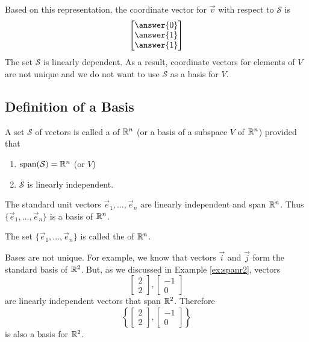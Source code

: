 \documentclass{ximera}
\begin{document}
\begin{example}
\begin{explanation}
Based on this representation, the coordinate vector for $\vec{v}$ with respect to $\mathcal{S}$ is
$$\begin{bmatrix}\answer{0}\\\answer{1}\\\answer{1}\end{bmatrix}$$
The set $\mathcal{S}$ is linearly dependent.  As a result, coordinate vectors for elements of $V$ are not unique and we do not want to use $\mathcal{S}$ as a basis for $V$.
\end{explanation}
\end{example}




\subsection*{Definition of a Basis}

\begin{definition}\label{def:basis}
A set $\mathcal{S}$ of vectors is called a  of $\mathbb{R}^n$ (or a basis of a subspace $V$ of $\mathbb{R}^n$) provided that 
\begin{enumerate}
\item \label{item:defbasis1}
$\mbox{span}(\mathcal{S})=\mathbb{R}^n$ (or $V$)
\item \label{item:defbasis2}
$\mathcal{S}$ is linearly independent.
\end{enumerate}
\end{definition}

\begin{example}\label{ex:standardbasis}
The standard unit vectors $\vec{e}_1, \ldots ,\vec{e}_n$ are linearly independent and span $\mathbb{R}^n$.  Thus $\{\vec{e}_1, \ldots ,\vec{e}_n\}$ is a basis of $\mathbb{R}^n$.
\end{example}

\begin{definition}\label{def:standardbasis} The set $\{\vec{e}_1, \ldots ,\vec{e}_n\}$ is called the  of $\mathbb{R}^n$.
\end{definition}

Bases are not unique.  For example, we know that vectors $\vec{i}$ and $\vec{j}$ form the standard basis of $\mathbb{R}^2$.  But, as we discussed in Example \ref{ex:spanr2}, vectors 
$$\begin{bmatrix}2\\2\end{bmatrix}, \begin{bmatrix}-1\\0\end{bmatrix}$$
are linearly independent vectors that span $\mathbb{R}^2$.  Therefore $$\left\{\begin{bmatrix}2\\2\end{bmatrix}, \begin{bmatrix}-1\\0\end{bmatrix}\right\}$$
is also a basis for $\mathbb{R}^2$.
\end{document}
